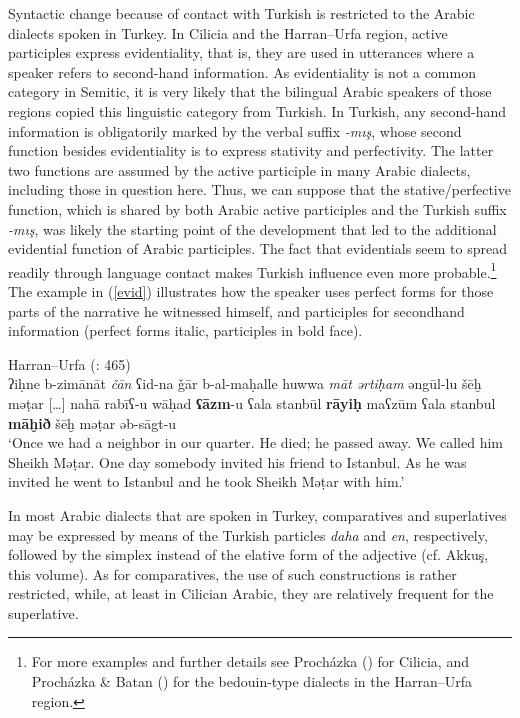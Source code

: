 \documentclass[output=paper]{langsci/langscibook}
\begin{document}
Syntactic change because of contact with Turkish is restricted to the Arabic dialects spoken in Turkey. In Cilicia and the Harran--Urfa region, active participles express evidentiality, that is, they are used in utterances where a speaker refers to second-hand information. As evidentiality is not a common category in Semitic, it is very likely that the bilingual Arabic speakers of those regions copied this linguistic category from Turkish. In Turkish, any second-hand information is obligatorily marked by the verbal suffix \textit{-mış}, whose second function besides evidentiality is to express stativity and perfectivity. The latter two functions are assumed by the active participle in many Arabic dialects, including those in question here. Thus, we can suppose that the stative/perfective function, which is shared by both Arabic active participles and the Turkish suffix \textit{-mış}, was likely the starting point of the development that led to the additional evidential function of Arabic participles. The fact that evidentials seem to spread readily through language contact \citep[10]{Aikhenvald2004} makes Turkish influence even more probable.\footnote{For more examples and further details see Procházka (\citeyear[200--201]{Procházka2002Cukurova}) for Cilicia, and Procházka \& Batan (\citeyear[464--465]{ProcházkaBatan2016}) for the bedouin-type dialects in the Harran--Urfa region.} The example in (\ref{evid}) illustrates how the speaker uses perfect forms for those parts of the narrative he witnessed himself, and participles for secondhand information (perfect forms italic, participles in bold face). 

\ea\label{ex:prochazka:} \label{evid}
{Harran--Urfa (\citealt{ProcházkaBatan2016}: 465)}\\
  ʔiḥne b-zimānāt \textit{čān} ʕid-na ǧār b-al-maḥalle huwwa \textit{māt} \textit{ərtiḥam} əngūl-lu šēḫ mǝṭar […] nahā{\R} rabīʕ-u wāḥad  \textbf{ʕāzm}{}-u ʕala stanbūl \textbf{rāyiḥ} maʕzūm ʕala stanbul \textbf{māḫið} šēḫ mǝṭar əb-sāgt-u\\

\glt ‘Once we had a neighbor in our quarter. He died; he passed away. We called him Sheikh Mǝṭar. One day somebody invited his friend to Istanbul. As he was invited he went to Istanbul and he took Sheikh Mǝṭar with him.’
\z

In most Arabic dialects that are spoken in Turkey, comparatives and superlatives may be expressed by means of the Turkish particles \textit{daha} and \textit{en}, respectively, followed by the simplex instead of the elative form of the adjective (cf. Akkuş, this volume). As for comparatives, the use of such constructions is rather restricted, while, at least in Cilician Arabic, they are relatively frequent for the superlative. 
\end{document}
